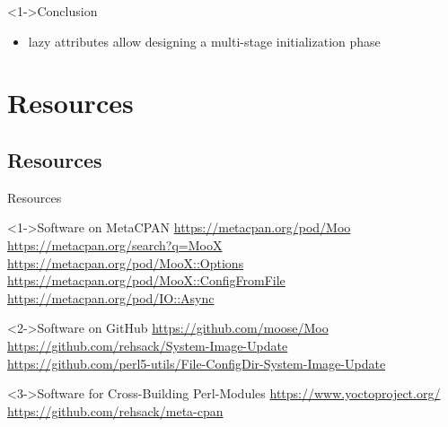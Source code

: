 \documentclass[ngerman,xcolor={table,dvipsnames},smaller,compress,hyperref={bookmarks,colorlinks},handout]{beamer}%
\begin{document}
\begin{frame}[t,fragile]

\begin{block}<1->{Conclusion}
\begin{itemize}
\item lazy attributes allow designing a multi-stage initialization phase
\begin{itemize}
\end{itemize}
\end{itemize}
\end{block}

\end{frame}

\section{Resources}

\subsection{Resources}

\begin{frame}[t,fragile]{Resources}
\begin{block}<1->{Software on MetaCPAN}
\url{https://metacpan.org/pod/Moo} \\
\url{https://metacpan.org/search?q=MooX} \\
\url{https://metacpan.org/pod/MooX::Options} \\
\url{https://metacpan.org/pod/MooX::ConfigFromFile} \\
\url{https://metacpan.org/pod/IO::Async}
\end{block}

\begin{block}<2->{Software on GitHub}
\url{https://github.com/moose/Moo} \\
\url{https://github.com/rehsack/System-Image-Update} \\
\url{https://github.com/perl5-utils/File-ConfigDir-System-Image-Update}
\end{block}

\begin{block}<3->{Software for Cross-Building Perl-Modules}
\url{https://www.yoctoproject.org/} \\
\url{https://github.com/rehsack/meta-cpan}
\end{block}
\end{frame}
\end{document}
